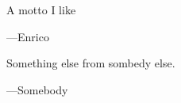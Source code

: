 \cleardoublepage\newpage\thispagestyle{empty}\null
\cleardoublepage\newpage\thispagestyle{empty}\null
\thispagestyle{empty}
\begin{large}
A motto I like
\begin{flushright}
---Enrico
\end{flushright}

\bigskip

Something else from sombedy else.
\begin{flushright}
---Somebody
\end{flushright}
\end{large}

\setlength{\abovedisplayskip}{-5pt}
\setlength{\abovedisplayshortskip}{-5pt}
